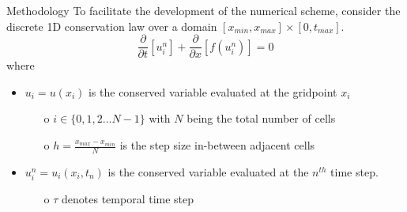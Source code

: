 \documentclass[9pt]{beamer}
\begin{document}
\begin{frame}{Methodology}
  To facilitate the development of the numerical scheme, consider the discrete 1D conservation law over a domain $[x_{min},x_{max}] \times [0,t_{max}]$.
  \begin{equation}
    \frac{\partial}{\partial t}[u_i^n] + \frac{\partial}{\partial x}[f(u_i^n)] = 0
  \end{equation}
  where 
  \begin{itemize}
    \item $u_i = u(x_i)$ is the conserved variable evaluated at the gridpoint $x_i$
    \begin{itemize}
      \item[o]  $i \in \{0,1,2 \dots N-1\}$ with $N$ being the total number of cells
      \item[o] $h = \frac{x_{max} - x_{min}}{N}$ is the step size in-between adjacent cells
    \end{itemize}
    \item $u_i^n = u_i(x_i,t_n)$ is the conserved variable evaluated at the $n^{th}$ time step.
    \begin{itemize}
      \item[o] $\tau$ denotes temporal time step 
    \end{itemize}
  \end{itemize}
\end{frame}


\end{document}
